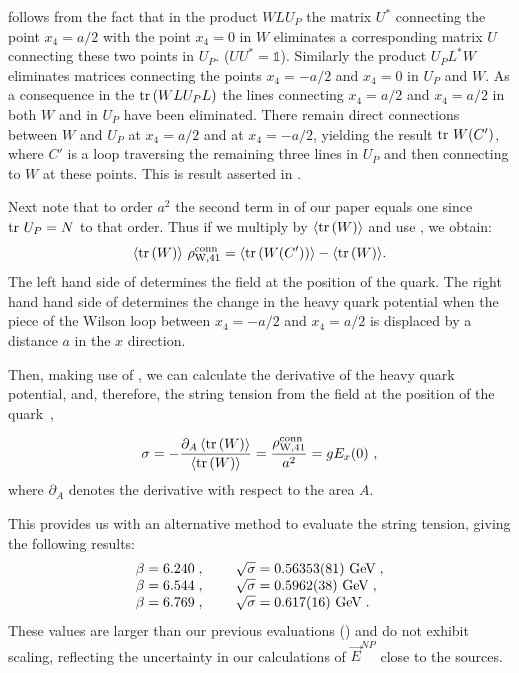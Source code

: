 \documentclass[pdftex,twocolumn,epjc3,envcountsect]{svjour3}
\DeclareMathOperator{\tr}{\rm tr\,}
\begin{document}
 follows from the fact that in the product $W L U_P$ the matrix $U^*$ connecting the point $x_4=a/2$  with the point $x_4=0$ in $W$  eliminates a corresponding matrix $U$ connecting these two points in $U_P$.  ($UU^* = \mathds{1}$).
Similarly  the product $U_P L^* W$ eliminates matrices connecting the points $x_4=-a/2$  and $x_4=0$  in $U_P$ and $W$.
As a consequence in the $\tr( W L U_P L)$ the lines connecting $x_4=a/2$ and $x_4=a/2$  in both $W$ and in $U_P$  have been eliminated.
There remain direct connections between $W$ and $U_P$ at $x_4=a/2$ and at $x_4=-a/2$,  yielding the result $\tr W(C')$, where $C'$ is a loop traversing the remaining three lines in $U_P$ and then connecting to $W$ at these points. This is result asserted in .

Next note that to order $a^2$  the second term in  of our paper equals one since $\tr U_P=N$ to that order.
Thus if we multiply  by $\langle \tr(W)\rangle$ and use , we obtain:
\begin{equation}
    \langle \tr(W) \rangle \ \rho^{\rm conn}_{{\rm W}, 41} = \langle \tr(W(C')) \rangle - \langle \tr(W) \rangle.
    \label{eq:A2}
\end{equation}
The left hand side of  determines the field at the position of the quark.
The right hand hand side of  determines the change in the heavy  quark potential when the piece of the Wilson loop between  $x_4=-a/2$ and $x_4=a/2$ is displaced by a distance $a$ in the $x$ direction.

Then, making use of , we can calculate the derivative of the heavy quark potential, and, therefore, the string tension from the field 
at the position of the quark~\cite{Brambilla:2021wqs,Brambilla:2021egm},

\begin{equation}
    \sigma = - \frac{\partial_A  \left \langle \tr(W) \right \rangle}{\left \langle \tr(W) \right \rangle} = \frac{\rho^{\rm conn}_{{\rm W}, 41}}{a^2} = g E_x(0) \ , 
    \label{eq:A3}
\end{equation}
where $\partial_A$ denotes the derivative with respect to the area $A$.


This provides us with an alternative method to evaluate the string tension, giving the
following results:
\[
\begin{array}{ll}
\beta=6.240\;, & \;\;\;\;\; \sqrt{\sigma}=0.56353(81) {\rm \ GeV}\;, \\
\beta=6.544\;, & \;\;\;\;\; \sqrt{\sigma}=0.5962(38)  {\rm \ GeV}\;, \\
\beta=6.769\;, & \;\;\;\;\; \sqrt{\sigma}=0.617(16)   {\rm \ GeV}\;. \\
\end{array}
\]
These values are larger than our previous evaluations  () and do not exhibit scaling, reflecting the uncertainty in our calculations of $\vec{E}^{NP}$ close to the sources.


\end{document}
